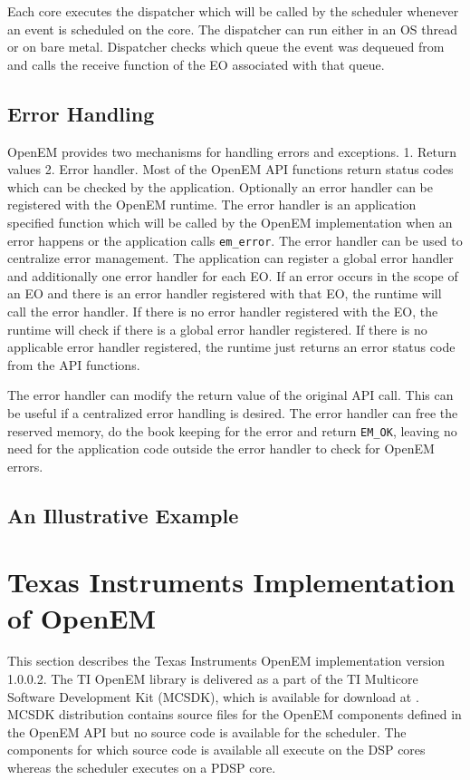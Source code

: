 Each core executes the dispatcher which will be called by the scheduler whenever an event is scheduled on the core. The dispatcher can run either in an OS thread or on bare metal. Dispatcher checks which queue the event was dequeued from and calls the receive function of the EO associated with that queue. \cite{openemintro}

\subsection{Error Handling}
\label{subsec:error}
OpenEM provides two mechanisms for handling errors and exceptions. 1. Return values 2. Error handler. Most of the OpenEM API functions return status codes which can be checked by the application. \cite{openempage} Optionally an error handler can be registered with the OpenEM runtime. The error handler is an application specified function which will be called by the OpenEM implementation when an error happens or the application calls \texttt{em\_error}. The error handler can be used to centralize error management. The application can register a global error handler and additionally one error handler for each EO. If an error occurs in the scope of an EO and there is an error handler registered with that EO, the runtime will call the error handler. If there is no error handler registered with the EO, the runtime will check if there is a global error handler registered. If there is no applicable error handler registered, the runtime just returns an error status code from the API functions. \cite{openempage}

The error handler can modify the return value of the original API call. This can be useful if a centralized error handling is desired. The error handler can free the reserved memory, do the book keeping for the error and return \texttt{EM\_OK}, leaving no need for the application code outside the error handler to check for OpenEM errors. \cite{openempage}

\subsection{An Illustrative Example}
\label{subsec:example}

\section[Texas Instruments Implementation of OpenEM]{Texas Instruments Implementation\\of OpenEM}
\label{sec:tiopenem}
This section describes the Texas Instruments OpenEM implementation version 1.0.0.2. The TI OpenEM library is delivered as a part of the TI Multicore Software Development Kit (MCSDK), which is available for download at \cite{mcsdkdown}. MCSDK distribution contains source files for the OpenEM components defined in the OpenEM API but no source code is available for the scheduler. The components for which source code is available all execute on the DSP cores whereas the scheduler executes on a PDSP core.

